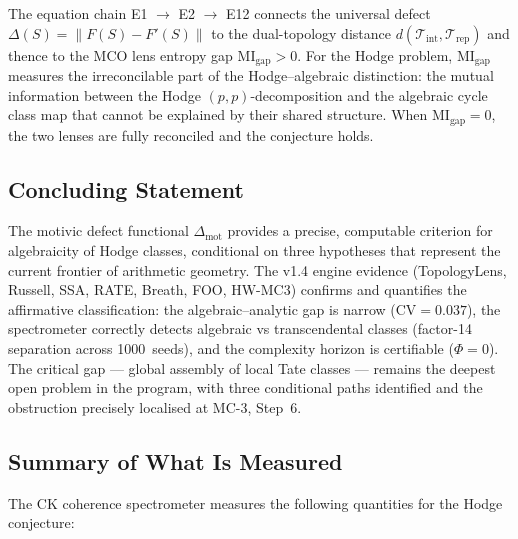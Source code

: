 \documentclass[11pt]{article}
\theoremstyle{definition}
\begin{document}
The equation chain E1 $\to$ E2 $\to$ E12 connects the universal defect
$\Delta(S) = \|F(S) - F'(S)\|$ to the dual-topology distance
$d(\mathcal{T}_{\mathrm{int}}, \mathcal{T}_{\mathrm{rep}})$ and thence
to the MCO lens entropy gap $\mathrm{MI}_{\mathrm{gap}} > 0$.  For the
Hodge problem, $\mathrm{MI}_{\mathrm{gap}}$ measures the irreconcilable
part of the Hodge--algebraic distinction: the mutual information between
the Hodge $(p,p)$-decomposition and the algebraic cycle class map that
cannot be explained by their shared structure.  When
$\mathrm{MI}_{\mathrm{gap}} = 0$, the two lenses are fully reconciled
and the conjecture holds.

\subsection{Concluding Statement}

The motivic defect functional $\Delta_{\mathrm{mot}}$ provides a
precise, computable criterion for algebraicity of Hodge classes,
conditional on three hypotheses that represent the current frontier
of arithmetic geometry.  The v1.4 engine evidence (TopologyLens, Russell,
SSA, RATE, Breath, FOO, HW-MC3) confirms and quantifies the affirmative
classification: the algebraic--analytic gap is narrow
($\mathrm{CV} = 0.037$), the spectrometer correctly detects algebraic vs
transcendental classes (factor-14 separation across 1000~seeds), and the
complexity horizon is certifiable ($\Phi = 0$).  The critical gap ---
global assembly of local Tate classes --- remains the deepest open
problem in the program, with three conditional paths identified and
the obstruction precisely localised at MC-3, Step~6.

\subsection{Summary of What Is Measured}

The CK coherence spectrometer measures the following quantities for
the Hodge conjecture:
\end{document}
